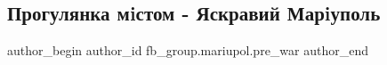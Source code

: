  
 
 
 
 

\subsection{Прогулянка мiстом - Яскравий Марiуполь}
\label{sec:19_02_2023.fb.fb_group.mariupol.pre_war.4.progulyanka_mistom__}

\ifcmt
 author_begin
   author_id fb_group.mariupol.pre_war
 author_end
\fi
